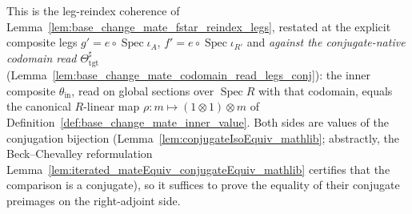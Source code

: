 \begin{lemma}

  \label{lem:base_change_mate_fstar_reindex_legs_conj}
  This is the leg-reindex coherence of Lemma~\ref{lem:base_change_mate_fstar_reindex_legs}, restated at
  the explicit composite legs \(g' = e \circ \operatorname{Spec}\iota_A\),
  \(f' = e \circ \operatorname{Spec}\iota_{R'}\) and \emph{against the conjugate-native codomain read}
  \(\Theta_{\mathrm{tgt}}^{\sharp}\) (Lemma~\ref{lem:base_change_mate_codomain_read_legs_conj}): the
  inner composite \(\theta_{\mathrm{in}}\), read on global sections over \(\operatorname{Spec} R\) with
  that codomain, equals the canonical \(R\)-linear map
  \(\rho : m \mapsto (1 \otimes 1) \otimes m\) of Definition~\ref{def:base_change_mate_inner_value}.
  Both sides are values of the conjugation bijection (Lemma~\ref{lem:conjugateIsoEquiv_mathlib};
  abstractly, the Beck--Chevalley reformulation Lemma~\ref{lem:iterated_mateEquiv_conjugateEquiv_mathlib}
  certifies that the comparison is a conjugate), so it suffices to prove the equality of their conjugate
  preimages on the right-adjoint side.
\end{lemma}

